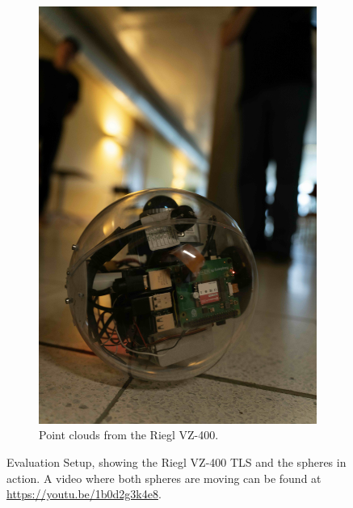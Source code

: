 \documentclass[conference]{IEEEtran}
\begin{document}
\begin{figure}[t]
\begin{subfigure}{0.48\columnwidth}
        \includegraphics[width=\textwidth]{pics/sphere_on_the_move.jpeg}
        \caption{Point clouds from the Riegl VZ-400.}
        \label{fig:sphere_on_the_move}
\end{subfigure}
\caption{Evaluation Setup, showing the Riegl VZ-400 TLS and the spheres in action. A video where both spheres are moving can be found at \url{https://youtu.be/1b0d2g3k4e8}.}

\end{figure}
\end{document}
